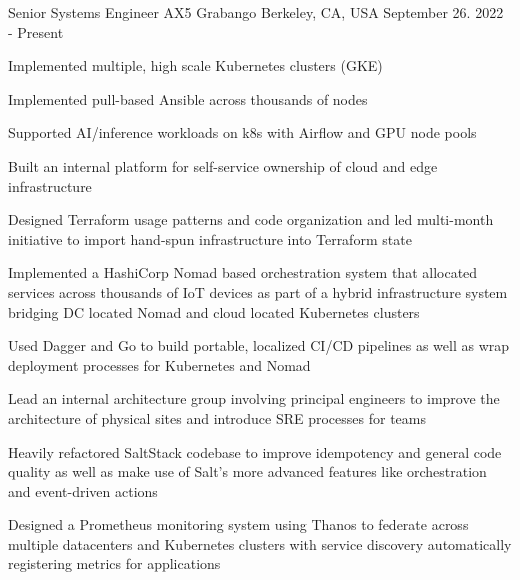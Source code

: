 

\begin{cventries}

  \cventry
    {Senior Systems Engineer AX5} %
    {Grabango} %
    {Berkeley, CA, USA} %
    {September 26. 2022 - Present} %
    {
      \begin{cvitems} %
        \item {Implemented multiple, high scale Kubernetes clusters (GKE)}
        \item {Implemented pull-based Ansible across thousands of nodes}
        \item {Supported AI/inference workloads on k8s with Airflow and GPU node pools}
        \item {Built an internal platform for self-service ownership of cloud and edge infrastructure}
        \item {Designed Terraform usage patterns and code organization and led multi-month initiative to import hand-spun infrastructure into Terraform state}
        \item {Implemented a HashiCorp Nomad based orchestration system that allocated services across thousands of IoT devices as part of a hybrid infrastructure system bridging DC located Nomad and cloud located Kubernetes clusters}
        \item {Used Dagger and Go to build portable, localized CI/CD pipelines as well as wrap deployment processes for Kubernetes and Nomad}
        \item {Lead an internal architecture group involving principal engineers to improve the architecture of physical sites and introduce SRE processes for teams}
        \item {Heavily refactored SaltStack codebase to improve idempotency and general code quality as well as make use of Salt's more advanced features like orchestration and event-driven actions}
        \item {Designed a Prometheus monitoring system using Thanos to federate across multiple datacenters and Kubernetes clusters with service discovery automatically registering metrics for applications}

\end{cvitems}}
\end{cventries}
